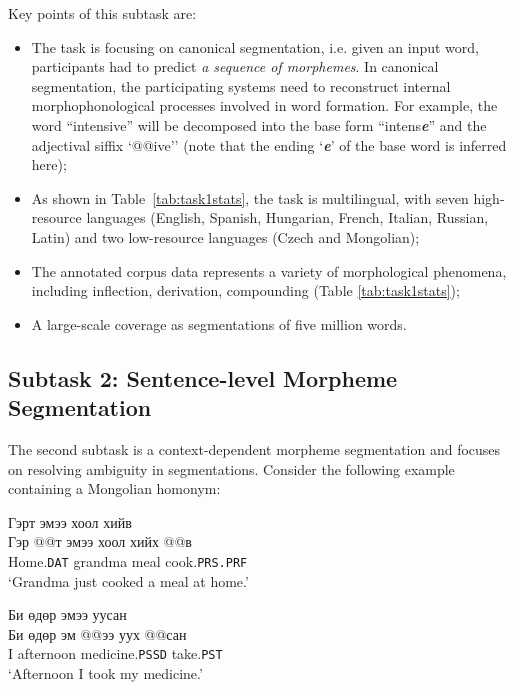 \documentclass[11pt]{article}
\begin{document}
Key points of this subtask are:
\begin{itemize}
\item The task is focusing on canonical segmentation, i.e. given an input word, participants had to predict \emph{a sequence of morphemes}. In canonical segmentation, the participating systems need to reconstruct internal morphophonological processes involved in word formation. For example, the word ``intensive'' will be decomposed into the base form ``intens\textit{\textbf{e}}''  and the adjectival siffix `@@ive'' (note that the ending `\textit{\textbf{e}}' of the base word is inferred here);
\item As shown in Table~\ref{tab:task1stats}, the task is multilingual, with seven high-resource languages (English, Spanish, Hungarian, French, Italian, Russian, Latin) and two low-resource languages (Czech and Mongolian);
\item The annotated corpus data represents a variety of morphological phenomena, including inflection, derivation, compounding (Table \ref{tab:task1stats});
\item A large-scale coverage as segmentations of five million words.
\end{itemize}






\subsection{Subtask 2: Sentence-level Morpheme Segmentation}
The second subtask is a context-dependent morpheme segmentation and focuses on resolving ambiguity in segmentations. Consider the following example containing a Mongolian homonym:
\begin{exe}
\ex
\glll \foreignlanguage{russian}{Гэрт} \foreignlanguage{russian}{эмээ} \foreignlanguage{russian}{хоол} \foreignlanguage{russian}{хийв}\\
\foreignlanguage{russian}{Гэр @@т} \foreignlanguage{russian}{эмээ} \foreignlanguage{russian}{хоол} \foreignlanguage{russian}{хийх @@в} \\
Home.\texttt{DAT} grandma meal cook.\texttt{PRS.PRF} \\
\glt `Grandma just cooked a meal at home.'
\end{exe}

\begin{exe}
\ex
\glll \foreignlanguage{russian}{Би} \foreignlanguage{russian}{өдөр} \foreignlanguage{russian}{эмээ} \foreignlanguage{russian}{уусан }\\
\foreignlanguage{russian}{Би} \foreignlanguage{russian}{өдөр} \foreignlanguage{russian}{эм @@ээ} \foreignlanguage{russian}{уух @@сан} \\
I afternoon medicine.\texttt{PSSD} take.\texttt{PST} \\
\glt `Afternoon I took my medicine.'
\end{exe}
\end{document}
